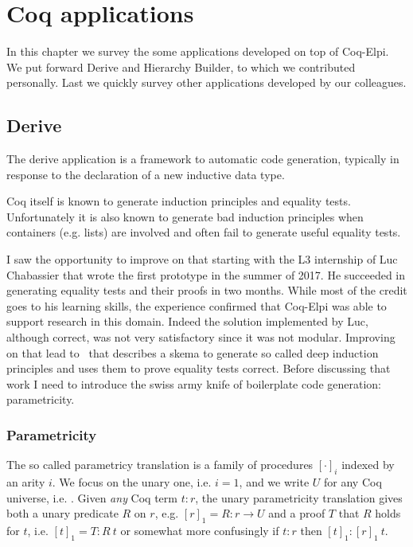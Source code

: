 \documentclass[a4paper, 11pt]{book}
\begin{document}
\chapter{Coq applications}

In this chapter we survey the some applications developed on top of Coq-Elpi.
We put forward Derive and Hierarchy Builder, to which we contributed personally.
Last we quickly survey other applications developed by our colleagues.

\section{Derive}

The derive application is a framework to automatic
code generation, typically in response to the declaration of a new inductive
data type.

Coq itself is known to generate induction principles and equality tests.
Unfortunately it is also known to generate bad induction principles when
containers (e.g. lists) are involved and often fail to generate useful
equality tests.

I saw the opportunity to improve on that starting with the L3 internship of
Luc Chabassier that wrote the first prototype in the summer of 2017.
He succeeded in generating
equality tests and their proofs in two months. While most of the credit goes to
his learning skills, the experience confirmed that Coq-Elpi was able to support
research in this domain. Indeed the solution implemented by Luc, although
correct, was not very satisfactory since it was not modular. Improving
on that lead to~\cite{tassi:hal-01897468} that describes a skema to
generate so called deep induction principles and uses them to prove
equality tests correct. Before discussing that work I need to introduce
the swiss army knife of boilerplate code generation: parametricity.

\subsection{Parametricity}

The so called parametricy translation \cite{keller_et_al:LIPIcs.CSL.2012.381}
is a family of procedures $[\cdot]_i$ indexed by an arity $i$. We focus on the
unary one, i.e. $i=1$, and we write $U$ for any Coq universe, i.e. .
Given \emph{any} Coq term $t : r$, the unary parametricity
translation gives both a unary predicate $R$ on $r$, e.g. $[r]_1 = R : r \to U$
and a proof $T$ that $R$ holds for $t$, i.e. $[t]_1 = T : R~ t$ or somewhat more
confusingly if $t : r$ then $[t]_1 : [r]_1~ t$.
\end{document}
